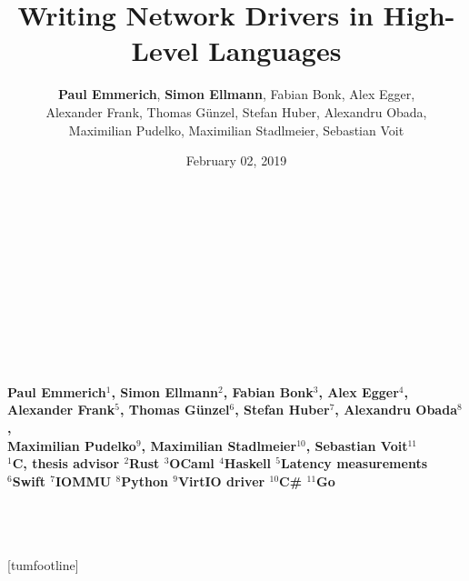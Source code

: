 \documentclass[NET,english,aspectratio=169,notitleframe]{tumbeamer}
\author[Paul Emmerich, Simon Ellmann]{\textbf{Paul Emmerich}, \textbf{Simon Ellmann}, Fabian Bonk, Alex Egger,\\ Alexander Frank, Thomas Günzel, Stefan Huber, Alexandru Obada,\\ Maximilian Pudelko, Maximilian Stadlmeier, Sebastian Voit}
\title{Writing Network Drivers in High-Level Languages}
\date{February 02, 2019}
\begin{document}
  \begin{frame}[c,noframenumbering]
  \centering%
  \Large%
  \strut\textcolor{TUMBlue}{\inserttitle}%
  \\[4ex]%
  \normalsize%
  \strut\insertauthor%
  \\[2ex]%
  \footnotesize%
  \insertdate%
  \\[4ex]%
  \ifdefined\departmentname%
    \ifdefined\chairname%
      \chairname\\%
    \fi%
    \departmentname\\%
  \fi%
  \TUMname\\%
\end{frame}

  \begin{frame}[c,noframenumbering]
  \centering%
  \Large%
  \strut\textcolor{TUMBlue}{\inserttitle}%
  \\[4ex]%
  \normalsize%
  \strut{}\bfseries Paul Emmerich$^1$, Simon Ellmann$^2$, Fabian Bonk$^3$, Alex Egger$^4$,\\ Alexander Frank$^5$, Thomas Günzel$^6$, Stefan Huber$^7$, Alexandru Obada$^8$,\\ Maximilian Pudelko$^9$, Maximilian Stadlmeier$^{10}$, Sebastian Voit$^{11}$ \normalfont %
  \\[2ex]%
  \footnotesize%
  $^1$C, thesis advisor\hspace{1em}
  $^2$Rust\hspace{1em}
  $^3$OCaml\hspace{1em}
  $^4$Haskell\hspace{1em}
  $^5$Latency measurements\hspace{1em}\\
  $^6$Swift\hspace{1em}
  $^7$IOMMU\hspace{1em}
  $^8$Python\hspace{1em}
  $^9$VirtIO driver\hspace{1em}
  $^{10}$C\#\hspace{1em}
  $^{11}$Go\hspace{1em}
  \\[4ex]%
    \ifdefined\departmentname%
    \ifdefined\chairname%
      \chairname\\%
    \fi%
    \departmentname\\%
  \fi%
  \TUMname\\%
\end{frame}
[tumfootline]
\end{document}
